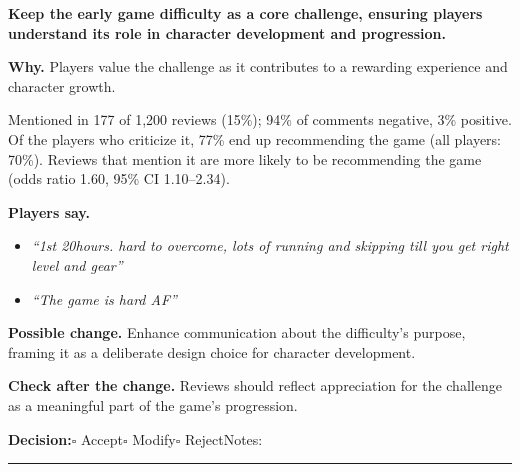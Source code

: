 \documentclass[10pt]{article}
\begin{document}
\begin{tcolorbox}[colback=white,colframe=gA,colbacktitle=lA,coltitle=black,title={\textbf{A1}\quad Early Game Difficulty\hfill\textcolor{gA}{\textbf{Accepted friction}}},boxrule=0.8pt,arc=2pt,left=6pt,right=6pt,top=4pt,bottom=4pt,before skip=8pt,after skip=8pt]
{\large\textbf{Keep the early game difficulty as a core challenge, ensuring players understand its role in character development and progression.}}

\smallskip
\textbf{Why.} Players value the challenge as it contributes to a rewarding experience and character growth.

\smallskip
{\small Mentioned in 177 of 1,200 reviews (15\%); 94\% of comments negative, 3\% positive. Of the players who criticize it, 77\% end up recommending the game (all players: 70\%). Reviews that mention it are more likely to be recommending the game {\color{ink2}\footnotesize(odds ratio 1.60, 95\% CI 1.10--2.34)}.}

\smallskip
\textbf{Players say.}
\begin{itemize}[leftmargin=12pt,itemsep=1pt,topsep=2pt]
    \item \textit{``1st 20hours. hard to overcome, lots of running and skipping till you get right level and gear''}
    \item \textit{``The game is hard AF''}
\end{itemize}
\textbf{Possible change.} Enhance communication about the difficulty's purpose, framing it as a deliberate design choice for character development.

\smallskip
\textbf{Check after the change.} Reviews should reflect appreciation for the challenge as a meaningful part of the game's progression.

\medskip
{\small\textbf{Decision:}\quad $\square$ Accept\quad $\square$ Modify\quad $\square$ Reject\qquad Notes: \rule{0.38\linewidth}{0.4pt}}
\end{tcolorbox}
\end{document}
